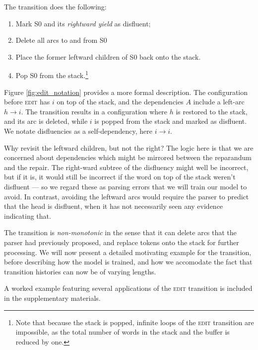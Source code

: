 \documentclass[11pt,letterpaper]{article}
\newcommand{\szero}{S0\xspace}
\begin{document}
The transition does the following:
\begin{enumerate}
\vspace*{-1ex}
    \itemsep0em
    \item Mark \szero and its \emph{rightward yield} as disfluent;
    \item Delete all arcs to and from \szero
    \item Place the former leftward children of \szero back onto the stack.
    \item Pop \szero from the stack.\footnote{Note that because the stack is
            popped, infinite loops of the \textsc{edit} transition are impossible,
        as the total number of words in the stack and the buffer is reduced by one.}
\vspace*{-1ex}
\end{enumerate}

Figure \ref{fig:edit_notation} provides a more formal description. The configuration
before \textsc{edit} has $i$ on top of the stack, and the dependencies $A$ include
a left-arc $h \rightarrow i$. The transition results in a configuration where
$h$ is restored to the stack, and its arc is deleted, while $i$ is popped from
the stack and marked as disfluent. We notate disfluencies as a self-dependency,
here $i \rightarrow i$.

Why revisit the leftward children, but not the right? The logic here is that we
are concerned about dependencies which might be mirrored between the reparandum
and the repair. The right-ward subtree of the disfluency might well be incorrect,
but if it is, it would still be incorrect if the word on top of the stack weren't
disfluent --– so we regard these as parsing errors that we will train our model
to avoid. In contrast, avoiding the leftward arcs would require the parser to
predict that the head is disfluent, when it has not necessarily seen any evidence
indicating that.

The transition is \emph{non-monotonic} in the sense that it can delete arcs
that the parser had previously proposed, and replace tokens onto the stack for
further processing.  We will now present a detailed motivating example for the
transition, before describing how the model is trained, and how we accomodate
the fact that transition histories can now be of varying lengths.

A worked example featuring several applications of the \textsc{edit} transition
is included in the supplementary materials.
\end{document}
